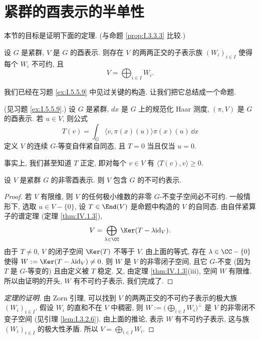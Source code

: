 \section{紧群的酉表示的半单性}
本节的目标是证明下面的定理. (与命题 \ref{prop:I.3.3.3} 比较.)

\begin{theorem}[紧群酉表示的半单性]
\label{thm:IV.2.1}
设 $G$ 是紧群, $V$ 是 $G$ 的酉表示. 则存在 $V$ 的两两正交的子表示族 $(W_i)_{i \in I}$ 使得每个 $W_i$ 不可约, 且
\[
V = \bigoplus_{i \in I}W_i.
\]
\end{theorem}

我们已经在习题 \ref{ex:I.5.5.9} 中见过关键的构造. 让我们把它总结成一个命题.

\begin{proposition}[等变自伴紧算子]
\label{prop:IV.2.2}
(见习题 \ref{ex:I.5.5.9}.) 设 $G$ 是紧群, $dx$ 是 $G$ 上的规范化 Haar 测度, $(\pi, V)$ 是 $G$ 的酉表示. 若 $u \in V$, 则公式
\[
T(v) = \int_G \langle v, \pi(x)(u) \rangle\pi(x)(u)\,\dd x
\]
定义 $V$ 的连续 $G$-等变自伴紧自同态, 且 $T = 0$ 当且仅当 $u = 0$.
\end{proposition}

事实上, 我们甚至知道 $T$ 正定, 即对每个 $v \in V$ 有 $\langle T(v), v \rangle \geq 0$.

\begin{corollary}[不可约子表示的存在性]
\label{cor:IV.2.3}
设 $V$ 是紧群 $G$ 的非零酉表示. 则 $V$ 包含 $G$ 的不可约表示.
\end{corollary}

\begin{proof}
若 $V$ 有限维, 则 $V$ 的任何极小维数的非零 $G$-不变子空间必不可约.
一般情形下, 选取 $u \in V - \{0\}$, 设 $T \in \End(V)$ 是命题中构造的 $V$ 的自同态. 由自伴紧算子的谱定理 (定理 \ref{thm:IV.1.3}),
\[
V = \bigoplus_{\lambda \in \CC}\Ker(T - \lambda\mathrm{id}_V).
\]
由于 $T \neq 0$, $V$ 的闭子空间 $\Ker(T)$ 不等于 $V$. 由上面的等式, 存在 $\lambda \in \CC - \{0\}$ 使得 $W := \Ker(T - \lambda\mathrm{id}_V) \neq 0$. 则 $W$ 是 $V$ 的非零闭子空间, 且它 $G$-不变 (因为 $T$ 是 $G$-等变的) 且由定义被 $T$ 稳定. 又, 由定理 \ref{thm:IV.1.3}(iii), 空间 $W$ 有限维. 所以由证明的开头, $W$ 有不可约子表示, 我们完成了.
\end{proof}

\begin{proof}[定理的证明]
由 Zorn 引理, 可以找到 $V$ 的两两正交的不可约子表示的极大族 $(W_i)_{i \in I}$. 假设 $W_i$ 的直和不在 $V$ 中稠密, 则 $W := \bigl(\bigoplus_{i \in I}W_i\bigr)^{\perp}$ 是 $V$ 的非零闭不变子空间 (见引理 \ref{lem:I.3.2.6}). 由上面的推论, 表示 $W$ 有不可约子表示, 这与族 $(W_i)_{i \in I}$ 的极大性矛盾. 所以 $V = \bigoplus_{i \in I}W_i$.
\end{proof}

